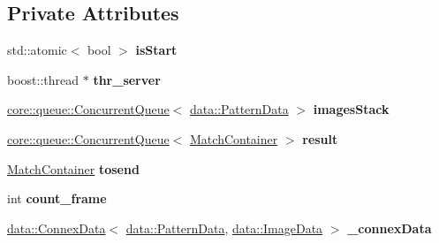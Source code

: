 \subsection*{Private Attributes}
\begin{DoxyCompactItemize}
\item 
\mbox{\label{classfilter_1_1algos_1_1_latch_ad318098b80c60481ab2f2cd5a31321a9}} 
std\+::atomic$<$ bool $>$ {\bfseries is\+Start}
\item 
\mbox{\label{classfilter_1_1algos_1_1_latch_a1eeea5843ff819c8a95acec9972b46f4}} 
boost\+::thread $\ast$ {\bfseries thr\+\_\+server}
\item 
\mbox{\label{classfilter_1_1algos_1_1_latch_acb287dda97f11f41b85f8a392082fea9}} 
\hyperlink{classcore_1_1queue_1_1_concurrent_queue}{core\+::queue\+::\+Concurrent\+Queue}$<$ \hyperlink{classfilter_1_1data_1_1_pattern_data}{data\+::\+Pattern\+Data} $>$ {\bfseries images\+Stack}
\item 
\mbox{\label{classfilter_1_1algos_1_1_latch_a51b4392b86133114c975bcc267124b6a}} 
\hyperlink{classcore_1_1queue_1_1_concurrent_queue}{core\+::queue\+::\+Concurrent\+Queue}$<$ \hyperlink{classfilter_1_1algos_1_1_latch_1_1_match_container}{Match\+Container} $>$ {\bfseries result}
\item 
\mbox{\label{classfilter_1_1algos_1_1_latch_ab0783a0e77018fd3d1bbb050a42020d3}} 
\hyperlink{classfilter_1_1algos_1_1_latch_1_1_match_container}{Match\+Container} {\bfseries tosend}
\item 
\mbox{\label{classfilter_1_1algos_1_1_latch_ad57751b48cc94f891d14dc342fcea132}} 
int {\bfseries count\+\_\+frame}
\item 
\mbox{\label{classfilter_1_1algos_1_1_latch_a0eb01db4033e17ce23598494d6e47fb2}} 
\hyperlink{classfilter_1_1data_1_1_connex_data}{data\+::\+Connex\+Data}$<$ \hyperlink{classfilter_1_1data_1_1_pattern_data}{data\+::\+Pattern\+Data}, \hyperlink{classfilter_1_1data_1_1_image_data}{data\+::\+Image\+Data} $>$ {\bfseries \+\_\+connex\+Data}
\end{DoxyCompactItemize}
